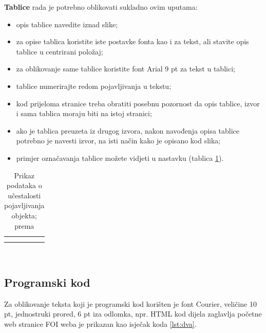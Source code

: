 \documentclass[]{foi}
\begin{document}
\textbf{Tablice} rada je potrebno oblikovati sukladno ovim uputama:
\begin{itemize}
    \item opis tablice navedite iznad slike;

    \item za opise tablica koristite iste postavke fonta kao i za tekst, ali stavite opis tablice u centrirani položaj;

    \item za oblikovanje same tablice koristite font Arial 9 pt za tekst u tablici;

    \item tablice numerirajte redom pojavljivanja u tekstu;

    \item kod prijeloma stranice treba obratiti posebnu pozornost da opis tablice, izvor i sama tablica moraju biti na istoj stranici; 

    \item ako je tablica preuzeta iz drugog izvora, nakon navođenja opisa tablice potrebno je navesti izvor, na isti način kako je opisano kod slika;

    \item primjer označavanja tablice možete vidjeti u nastavku (tablica \ref{tab:objekti}).
\end{itemize}

\begin{table}[h!] 
    \centering
    \caption{Prikaz podataka o učestalosti pojavljivanja objekta; prema \cite{wooldridge2009IntroductionMultiAgentSystems}}
    \begin{tabularx}{0.66\textwidth}{|X|X|X|X|}
        \hline
         \cellcolor{gray!25} & \cellcolor{gray!25} & \cellcolor{gray!25} & \cellcolor{gray!25} \\
        \hline
         &  &  &  \\
        \hline
         &  &  & \\
        \hline
    \end{tabularx}
    \\[10pt]
    \label{tab:objekti}
\end{table}

\subsection{Programski kod}

Za oblikovanje teksta koji je programski kod korišten je font Courier, veličine 10 pt, jednostruki prored, 6 pt iza odlomka, npr. HTML kod dijela zaglavlja početne web stranice FOI weba je prikazan kao isječak koda \ref{lst:dva}.
\end{document}
